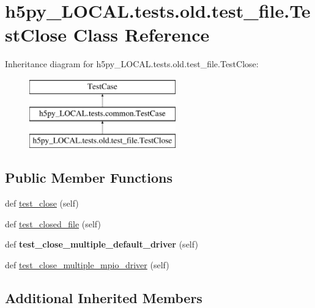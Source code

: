 \hypertarget{classh5py__LOCAL_1_1tests_1_1old_1_1test__file_1_1TestClose}{}\section{h5py\+\_\+\+L\+O\+C\+A\+L.\+tests.\+old.\+test\+\_\+file.\+Test\+Close Class Reference}
\label{classh5py__LOCAL_1_1tests_1_1old_1_1test__file_1_1TestClose}
Inheritance diagram for h5py\+\_\+\+L\+O\+C\+A\+L.\+tests.\+old.\+test\+\_\+file.\+Test\+Close\+:\begin{figure}[H]
\begin{center}
\leavevmode
\includegraphics[height=3.000000cm]{classh5py__LOCAL_1_1tests_1_1old_1_1test__file_1_1TestClose}
\end{center}
\end{figure}
\subsection*{Public Member Functions}
\begin{DoxyCompactItemize}
\item 
def \hyperlink{classh5py__LOCAL_1_1tests_1_1old_1_1test__file_1_1TestClose_ae609f084d70fb53adf37a6224f40e90f}{test\+\_\+close} (self)
\item 
def \hyperlink{classh5py__LOCAL_1_1tests_1_1old_1_1test__file_1_1TestClose_a17a9ad9f2ce4f4d285fb2c0c91b721a2}{test\+\_\+closed\+\_\+file} (self)
\item 
\mbox{\label{classh5py__LOCAL_1_1tests_1_1old_1_1test__file_1_1TestClose_ae313aafce6f3007f58d8f756aa18bf58}} 
def {\bfseries test\+\_\+close\+\_\+multiple\+\_\+default\+\_\+driver} (self)
\item 
def \hyperlink{classh5py__LOCAL_1_1tests_1_1old_1_1test__file_1_1TestClose_a2a4f3b4c75399922b2db2793a450214d}{test\+\_\+close\+\_\+multiple\+\_\+mpio\+\_\+driver} (self)
\end{DoxyCompactItemize}
\subsection*{Additional Inherited Members}


